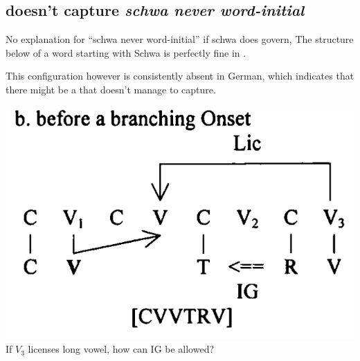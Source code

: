\subsection{\CVCV doesn't capture \emph{schwa never word-initial}}
No explanation for \enquote{schwa never word-initial} if schwa does govern,
The structure below of a word starting with Schwa is perfectly
fine in \CVCV.

This configuration however is consistently absent in German,
which indicates that there might be a 
that \CVCV doesn't manage to capture.

\begin{structure}{}
  \wordstart
  \V{\schwaCons}
\end{structure}

\cite[p.~650]{scheer2004}
\includegraphics[width=.5\textwidth]{figures/lic-over-branching-onset.png}
\\If $V_3$ licenses long vowel, how can IG be allowed?